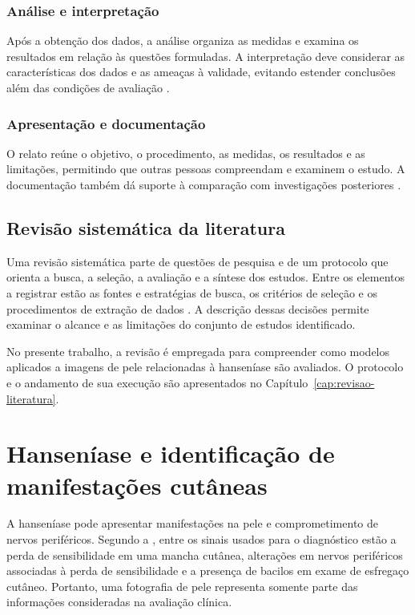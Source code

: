 \subsubsection{Análise e interpretação}

Após a obtenção dos dados, a análise organiza as medidas e examina os
resultados em relação às questões formuladas. A interpretação deve
considerar as características dos dados e as ameaças à validade, evitando
estender conclusões além das condições de avaliação \cite{wohlin2024}.

\subsubsection{Apresentação e documentação}

O relato reúne o objetivo, o procedimento, as medidas, os resultados e as
limitações, permitindo que outras pessoas compreendam e examinem o estudo.
A documentação também dá suporte à comparação com investigações posteriores
\cite{wohlin2024}.

\subsection{Revisão sistemática da literatura}

Uma revisão sistemática parte de questões de pesquisa e de um protocolo
que orienta a busca, a seleção, a avaliação e a síntese dos estudos. Entre
os elementos a registrar estão as fontes e estratégias de busca, os critérios
de seleção e os procedimentos de extração de dados
\cite{kitchenham2007,wohlin2024}. A descrição dessas decisões permite
examinar o alcance e as limitações do conjunto de estudos identificado.

No presente trabalho, a revisão é empregada para compreender como modelos
aplicados a imagens de pele relacionadas à hanseníase são avaliados. O
protocolo e o andamento de sua execução são apresentados no
Capítulo~\ref{cap:revisao-literatura}.

\section{Hanseníase e identificação de manifestações cutâneas}

A hanseníase pode apresentar manifestações na pele e comprometimento de
nervos periféricos. Segundo a , entre os
sinais usados para o diagnóstico estão a perda de sensibilidade em uma
mancha cutânea, alterações em nervos periféricos associadas à perda de
sensibilidade e a presença de bacilos em exame de esfregaço cutâneo.
Portanto, uma fotografia de pele representa somente parte das informações
consideradas na avaliação clínica.

